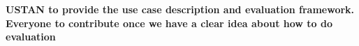  
\textbf{USTAN to provide the use case description and evaluation framework. Everyone to contribute once we have a clear idea about how to do evaluation}


